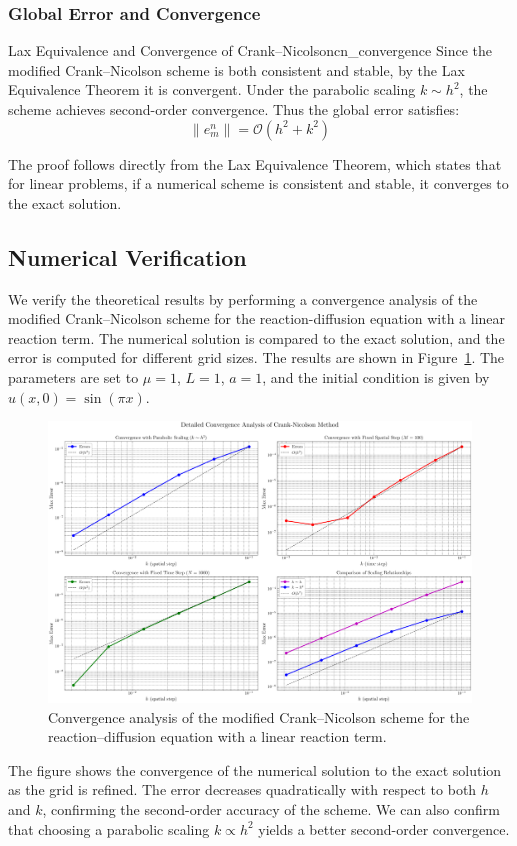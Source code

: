 \subsubsection{Global Error and Convergence}
\begin{theorem}{Lax Equivalence and Convergence of Crank--Nicolson}{cn_convergence}
  Since the modified Crank--Nicolson scheme is both consistent and stable, by the Lax Equivalence Theorem it is convergent. Under the parabolic scaling $k \sim h^2$, the scheme achieves
  second-order convergence. Thus the global error satisfies:
  \[
    \|e_m^n\| = \mathcal{O}\!\left(h^2 + k^2\right)
  \]
\end{theorem}

\begin{remark}{}{}
  The proof follows directly from the Lax Equivalence Theorem, which states that for linear problems, if a numerical scheme is consistent and stable, it converges to the exact solution.
\end{remark}

\subsection{Numerical Verification}
We verify the theoretical results by performing a convergence analysis of the modified Crank--Nicolson scheme for the reaction-diffusion equation with a linear reaction term. The numerical solution is compared to the exact solution, and the error is computed for different grid sizes. The results are shown in Figure~\ref{fig:convergence_analysis_2d}.
The parameters are set to \(\mu = 1\), \(L = 1\), \(a = 1\), and the initial condition is given by \(u(x,0) = \sin(\pi x)\).
\begin{figure}[H]
  \centering
  \includegraphics[width=1.0\textwidth]{figures/convergence_analysis_2d.png}
  \caption{Convergence analysis of the modified Crank--Nicolson scheme for the reaction--diffusion equation with a linear reaction term.}
  \label{fig:convergence_analysis_2d}
\end{figure}
The figure shows the convergence of the numerical solution to the exact solution as the grid is refined.
The error decreases quadratically with respect to both \(h\) and \(k\), confirming the second-order accuracy of the scheme.
We can also confirm that choosing a parabolic scaling \(k \propto h^2\) yields a better second-order convergence.